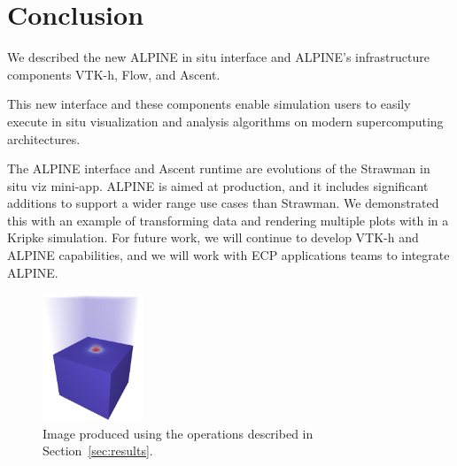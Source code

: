 \documentclass[sigconf]{acmart}
\begin{document}


\maketitle







\section{Conclusion}

We described the new ALPINE in situ interface and ALPINE's infrastructure components VTK-h, Flow, and Ascent.

This new interface and these components enable simulation users to easily execute in situ visualization and analysis algorithms
on modern supercomputing architectures. 

The ALPINE interface and Ascent runtime are evolutions of the Strawman in situ viz mini-app. ALPINE is aimed at production, and it includes significant additions to support a wider range use cases than Strawman. We demonstrated this with an example of transforming data and rendering multiple plots with in a Kripke simulation. 
%
%
%
For future work, we will continue to develop VTK-h and ALPINE capabilities, and we will work with ECP applications teams to integrate ALPINE.
 
\begin{figure}
	\includegraphics[width=3cm]{images/kripke}
	\caption{\label{kripke}Image produced using the operations described in Section~\ref{sec:results}.}
\end{figure}





 
\end{document}
